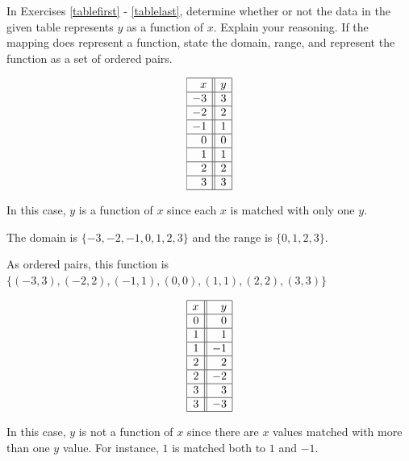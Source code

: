 \documentclass{ximera}
\begin{document}
\begin{question}
    
In Exercises \ref{tablefirst} - \ref{tablelast}, determine whether or not the data in the given table represents $y$ as a function of $x$.  Explain your reasoning.  If the mapping does represent a function, state the domain, range, and represent the function as a set of ordered pairs.


\begin{problem}

\label{tablefirst}
    \[\begin{array}{|r||r|}  \hline

x  &  y  \\ \hline
 -3 &  3 \\  \hline
 -2 & 2  \\  \hline
  -1 &  1  \\  \hline
 0 &  0 \\  \hline
 1 & 1  \\  \hline
 2 &  2 \\  \hline
 3 & 3  \\  \hline

\end{array}\]

\begin{solution}
In this case, $y$ is a function of $x$ since each $x$ is matched with only one $y$.  

The domain is $\{ -3, -2, -1,0,1,2,3 \}$ and the range is $\{ 0,1,2,3 \}$.  

As ordered pairs, this function is $\{ (-3,3), (-2,2), (-1,1), (0,0), (1,1), (2,2), (3,3) \}$
\end{solution}
\end{problem}

\begin{problem}\label{tablelast}

    \[\begin{array}{|r||r|}  \hline

 x  & y  \\ \hline

 0 & 0 \\  \hline
 1 & 1  \\  \hline
 1 & -1  \\  \hline
 2 &  2 \\  \hline
 2 & -2  \\  \hline
 3 &  3 \\  \hline
 3 & -3  \\  \hline

\end{array}\]

\begin{solution}
In this case, $y$ is not a function of $x$ since there are $x$ values matched with more than one $y$ value.  For instance, $1$ is matched both to $1$ and $-1$.
\end{solution}
\end{problem}

\end{question}
\end{document}
